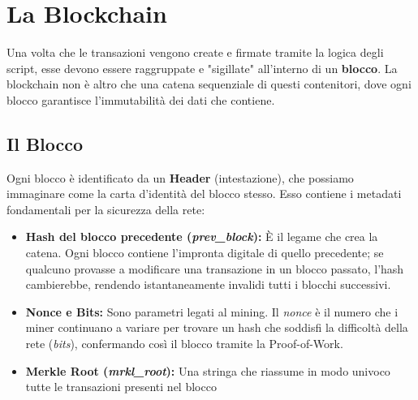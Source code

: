 \chapter{La Blockchain}
Una volta che le transazioni vengono create e firmate tramite la logica degli script, esse devono essere raggruppate e "sigillate" all'interno di un \textbf{blocco}. 
La blockchain non è altro che una catena sequenziale di questi contenitori, dove ogni blocco garantisce l'immutabilità dei dati che contiene.
\section{Il Blocco}
Ogni blocco è identificato da un \textbf{Header} (intestazione), che possiamo immaginare come la carta d'identità del blocco stesso. Esso contiene i metadati fondamentali per la sicurezza della rete:
\begin{itemize}
    \item \textbf{Hash del blocco precedente (\textit{prev\_block}):} È il legame che crea la catena. Ogni blocco contiene l'impronta digitale di quello precedente; se qualcuno provasse a modificare una transazione in un blocco passato, l'hash cambierebbe, rendendo istantaneamente invalidi tutti i blocchi successivi.
    \item \textbf{Nonce e Bits:} Sono parametri legati al mining. Il \textit{nonce} è il numero che i miner continuano a variare per trovare un hash che soddisfi la difficoltà della rete (\textit{bits}), confermando così il blocco tramite la Proof-of-Work.
    \item \textbf{Merkle Root (\textit{mrkl\_root}):} Una stringa che riassume in modo univoco tutte le transazioni presenti nel blocco
\end{itemize}
    
